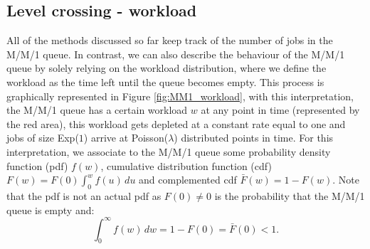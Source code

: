 \documentclass[12pt]{report}
\begin{document}
\begin{appendices}
\section{Level crossing - workload} \label{sec:MM1_level_cross_WL}
All of the methods discussed so far keep track of the number of jobs in the M/M/1 queue. In contrast, we can also describe the behaviour of the M/M/1 queue by solely relying on the workload distribution, where we define the workload as the time left until the queue becomes empty. This process is graphically represented in Figure \ref{fig:MM1_workload}, with this interpretation, the M/M/1 queue has a certain workload $w$ at any point in time (represented by the red area), this workload gets depleted at a constant rate equal to one and jobs of size Exp($1$) arrive at Poisson($\lambda$) distributed points in time. For this interpretation, we associate to the M/M/1 queue some probability density function (pdf) $f(w)$, cumulative distribution function (cdf) $F(w) = F(0) \int_0^w f(u) \, du$ and complemented cdf $\bar F(w) = 1-F(w)$. Note that the pdf is not an actual pdf as $F(0) \neq 0$ is the probability that the M/M/1 queue is empty and: 
$$
\int_0^\infty f(w) \, dw = 1-F(0) = \bar F(0) < 1.
$$


\end{appendices}
\end{document}
